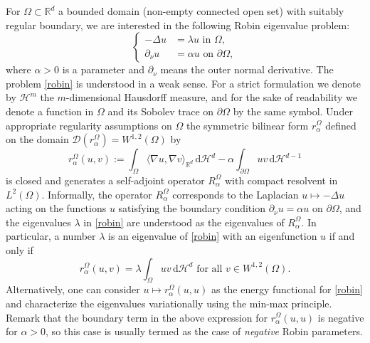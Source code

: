 \documentclass[11pt,oneside,reqno,a4paper]{amsart}
\newcommand{\dd}{\mathrm{d}}
\newcommand{\cD}{\mathcal{D}}
\newcommand{\R}{\mathbb{R}}
\renewcommand{\H}{\mathcal{H}}
\theoremstyle{definition}
\begin{document}
For $\Omega\subset\R^d$ a bounded domain (non-empty connected open set) with suitably regular boundary,
we are interested in the following Robin eigenvalue problem:
\begin{equation}
	\label{robin}
\left\{
	\begin{aligned}
		-\Delta u&=\lambda u \text{ in }\Omega,\\
		\partial_\nu u&=\alpha u \text{ on }\partial\Omega,
	\end{aligned}	
\right.
\end{equation}
where $\alpha>0$ is a parameter and $\partial_\nu$ means the outer normal derivative. The problem \eqref{robin} is understood in a weak sense. For a strict formulation we denote by $\H^m$ the $m$-dimensional Hausdorff measure, and for the sake of readability we denote a function in $\Omega$ and its Sobolev trace on $\partial \Omega$ by the same symbol.
Under appropriate regularity assumptions on $\Omega$ the symmetric bilinear form $r^\Omega_\alpha$
defined on the domain $\cD(r^\Omega_\alpha)=W^{1,2}(\Omega)$ by
\[
r^\Omega_\alpha(u,v):=\int_\Omega \langle\nabla u,\nabla v\rangle_{\R^d}\,\dd\H^d -\alpha\int_{\partial \Omega}uv\,\dd \H^{d-1}
\]
is closed and generates a self-adjoint operator
$R^\Omega_\alpha$ with compact resolvent in $L^2(\Omega)$. Informally, the operator $R^\Omega_\alpha$ corresponds to the Laplacian $u\mapsto -\Delta u$ acting on the functions $u$ satisfying the boundary condition $\partial_\nu u=\alpha u$ on $\partial\Omega$, and the eigenvalues $\lambda$ in \eqref{robin} are understood as the eigenvalues of $R^\Omega_\alpha$. In particular, a number $\lambda$ is an eigenvalue of \eqref{robin} with an eigenfunction $u$ if and only if
\[
r^\Omega_\alpha(u,v)=\lambda \int_\Omega uv\,\dd\H^d \text{ for all } v\in W^{1,2}(\Omega).
\]
Alternatively, one can consider $u\mapsto r^\Omega_\alpha(u,u)$ as the energy functional for \eqref{robin} and characterize the eigenvalues variationally %
using the min-max principle. Remark that the boundary term in the above expression for $r^\Omega_\alpha(u,u)$ is negative for $\alpha>0$, so this case is usually termed as the case of \emph{negative} Robin parameters. 
\end{document}
